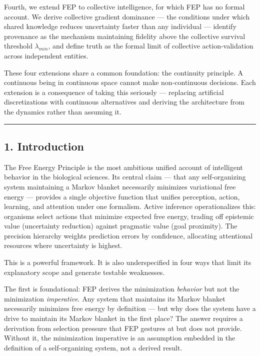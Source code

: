 \documentclass[
]{article}
\begin{document}
Fourth, we extend FEP to collective intelligence, for which FEP has no
formal account. We derive collective gradient dominance --- the
conditions under which shared knowledge reduces uncertainty faster than
any individual --- identify provenance as the mechanism maintaining
fidelity above the collective survival threshold \(\lambda_{min}\), and
define truth as the formal limit of collective action-validation across
independent entities.

These four extensions share a common foundation: the continuity
principle. A continuous being in continuous space cannot make
non-continuous decisions. Each extension is a consequence of taking this
seriously --- replacing artificial discretizations with continuous
alternatives and deriving the architecture from the dynamics rather than
assuming it.

\begin{center}\rule{0.5\linewidth}{0.5pt}\end{center}

\subsection{1. Introduction}\label{introduction}

The Free Energy Principle \cite{Friston2010} is the most ambitious
unified account of intelligent behavior in the biological sciences. Its
central claim --- that any self-organizing system maintaining a Markov
blanket necessarily minimizes variational free energy --- provides a
single objective function that unifies perception, action, learning, and
attention under one formalism. Active inference \cite{Friston2017}
operationalizes this: organisms select actions that minimize expected
free energy, trading off epistemic value (uncertainty reduction) against
pragmatic value (goal proximity). The precision hierarchy weights
prediction errors by confidence, allocating attentional resources where
uncertainty is highest.

This is a powerful framework. It is also underspecified in four ways
that limit its explanatory scope and generate testable weaknesses.

The first is foundational: FEP derives the minimization \emph{behavior}
but not the minimization \emph{imperative}. Any system that maintains
its Markov blanket necessarily minimizes free energy by definition ---
but why does the system have a drive to maintain its Markov blanket in
the first place? The answer requires a derivation from selection
pressure that FEP gestures at but does not provide. Without it, the
minimization imperative is an assumption embedded in the definition of a
self-organizing system, not a derived result.
\end{document}
